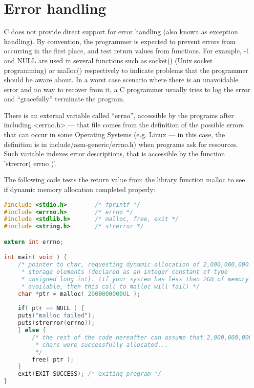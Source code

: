 \section{Error handling}
C does not provide direct support for error handling (also known as exception
handling). By convention, the programmer is expected to prevent errors from
occurring in the first place, and test return values from functions. For
example, -1 and NULL are used in several functions such as socket() (Unix
socket programming) or malloc() respectively to indicate problems that the
programmer should be aware about. In a worst case scenario where there is an
unavoidable error and no way to recover from it, a C programmer usually tries
to log the error and ``gracefully'' terminate the program. 

There is an external variable called ``errno'', accessible by the programs
after including \textless{}errno.h\textgreater{} --- that file comes from the
definition of the possible errors that can occur in some Operating Systems
(e.g. Linux --- in this case, the definition is in include/asm-generic/errno.h)
when programs ask for resources. Such variable indexes error descriptions, that
is accessible by the function 'strerror( errno )'. 

The following code tests the return value from the library function malloc to
see if dynamic memory allocation completed properly:
\lstset{basicstyle=\scriptsize, numbers=left, captionpos=b, tabsize=4}
\begin{lstlisting}[caption=Section \thesection listing \arabic{errorcnt},language={C},
breaklines=true,xleftmargin=15pt, label=lst:section\thesection listing\arabic{errorcnt}]
#include <stdio.h>        /* fprintf */
#include <errno.h>        /* errno */
#include <stdlib.h>       /* malloc, free, exit */
#include <string.h>       /* strerror */

extern int errno;

int main( void ) {
	/* pointer to char, requesting dynamic allocation of 2,000,000,000
	 * storage elements (declared as an integer constant of type
	 * unsigned long int). (If your system has less than 2GB of memory
	 * available, then this call to malloc will fail) */
	char *ptr = malloc( 2000000000UL );
	
	if( ptr == NULL ) {
	puts("malloc failed");
	puts(strerror(errno));
	} else {
		/* the rest of the code hereafter can assume that 2,000,000,000
		 * chars were successfully allocated... 
		 */
		free( ptr );
	}
	exit(EXIT_SUCCESS); /* exiting program */
}
\end{lstlisting}

